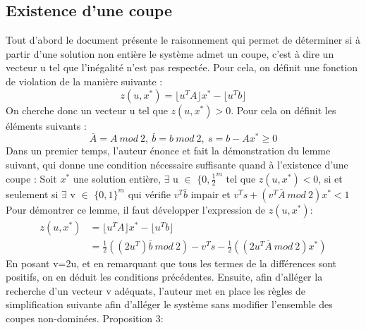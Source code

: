 \documentclass[12pt]{report}
\begin{document}
\subsection{Existence d'une coupe}
Tout d'abord le document présente le raisonnement qui permet de déterminer si à partir d'une solution non entière le système admet un coupe, c'est à dire un vecteur u tel que l'inégalité n'est pas respectée. Pour cela, on définit une fonction de violation de la manière suivante :
$$
z(u,x^\ast)=\lfloor u^TA \rfloor x^\ast-\lfloor u^Tb \rfloor
$$
On cherche donc un vecteur u tel que $z(u,x^\ast)>0$.
Pour cela on définit les éléments suivants :
$$
\overset{\_}{A}=A \ mod \ 2, \ \overset{\_}{b}=b \ mod \ 2,\ s = b-Ax^\ast \ge 0
$$
Dans un premier temps, l'auteur énonce et fait la démonstration du lemme suivant, qui donne une condition nécessaire suffisante quand à l'existence d'une coupe :
\newline
\newline
Soit $x^\ast$ une solution entière, $\exists$ u $\in$ $\{0,\frac{1}{2}^m$ tel que $z(u,x^\ast)<0$, si et seulement si $\exists$ v $\in$ $\{0,1\}^m$ qui vérifie $v^T\overset{\_}{b}$ impair et $v^Ts+(v^T\overset{\_}{A}\ mod\ 2)x^\ast < 1 $
\newline
\newline
Pour démontrer ce lemme, il faut développer l'expression de $z(u,x^\ast)$:
\newline
\begin{equation}
\begin{split}
z(u,x^\ast) & =\lfloor u^TA \rfloor x^\ast-\lfloor u^Tb \rfloor \\
 & = \frac{1}{2}((2u^T)\overset{\_}{b}\ mod\ 2) -v^Ts-\frac{1}{2}((2u^T\overset{\_}{A}\ mod \ 2)x^\ast)
\end{split}
\end{equation}
En posant v=2u, et en remarquant que tous les termes de la différences sont positifs, on en déduit les conditions précédentes.
\newline
Ensuite, afin d'alléger la recherche d'un vecteur v adéquats, l'auteur met en place les règles de simplification suivante afin d'alléger le système sans modifier l'ensemble des coupes non-dominées.
\newline
Proposition 3:
\end{document}
